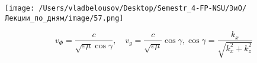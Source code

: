 \documentclass[12pt, a4paper]{report}
\begin{document}
\begin{center}
    \texttt{[image: /Users/vladbelousov/Desktop/Semestr\_4-FP-NSU/ЭиО/Лекции\_по\_дням/image/57.png]}
\end{center}

\[ v_{\Phi } = \frac{c }{ \sqrt{\varepsilon \mu   }\cos \gamma}  , \quad  v_g = \frac{c }{ \sqrt{\varepsilon \mu  }}\cos \gamma , \cos \gamma = \frac{ k_x }{\sqrt{k_x ^2 + k_z ^2 }}   \] 


\ifdefined\mainfile
\else
    
\end{document}
